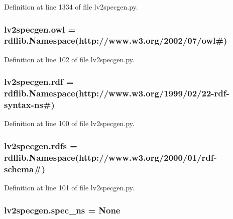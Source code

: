Definition at line 1334 of file lv2specgen.\+py.

\subsubsection[{\texorpdfstring{owl}{owl}}]{\setlength{\rightskip}{0pt plus 5cm}lv2specgen.\+owl = rdflib.\+Namespace(\textquotesingle{}http\+://www.\+w3.\+org/2002/07/owl\#\textquotesingle{})}\hypertarget{namespacelv2specgen_a3123d02015376b4a32a319bdd7357e11}{}\label{namespacelv2specgen_a3123d02015376b4a32a319bdd7357e11}


Definition at line 102 of file lv2specgen.\+py.

\subsubsection[{\texorpdfstring{rdf}{rdf}}]{\setlength{\rightskip}{0pt plus 5cm}lv2specgen.\+rdf = rdflib.\+Namespace(\textquotesingle{}http\+://www.\+w3.\+org/1999/02/22-\/rdf-\/{\bf syntax}-\/{\bf ns}\#\textquotesingle{})}\hypertarget{namespacelv2specgen_a81517e35ec2b1d55913afce433295382}{}\label{namespacelv2specgen_a81517e35ec2b1d55913afce433295382}


Definition at line 100 of file lv2specgen.\+py.

\subsubsection[{\texorpdfstring{rdfs}{rdfs}}]{\setlength{\rightskip}{0pt plus 5cm}lv2specgen.\+rdfs = rdflib.\+Namespace(\textquotesingle{}http\+://www.\+w3.\+org/2000/01/{\bf rdf}-\/schema\#\textquotesingle{})}\hypertarget{namespacelv2specgen_a6b4ab5b19d75b926da9675d42b04edb8}{}\label{namespacelv2specgen_a6b4ab5b19d75b926da9675d42b04edb8}


Definition at line 101 of file lv2specgen.\+py.

\subsubsection[{\texorpdfstring{spec\+\_\+ns}{spec_ns}}]{\setlength{\rightskip}{0pt plus 5cm}lv2specgen.\+spec\+\_\+ns = None}\hypertarget{namespacelv2specgen_a5846fdd64c9c66ada558d3c4d59615e5}{}\label{namespacelv2specgen_a5846fdd64c9c66ada558d3c4d59615e5}


